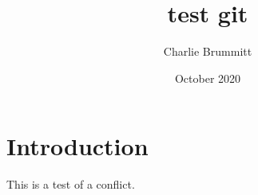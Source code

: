 \documentclass{article}
\title{test git}
\author{Charlie Brummitt}
\date{October 2020}
\begin{document}
\maketitle

\section{Introduction}
This is a test of a conflict.
\end{document}
